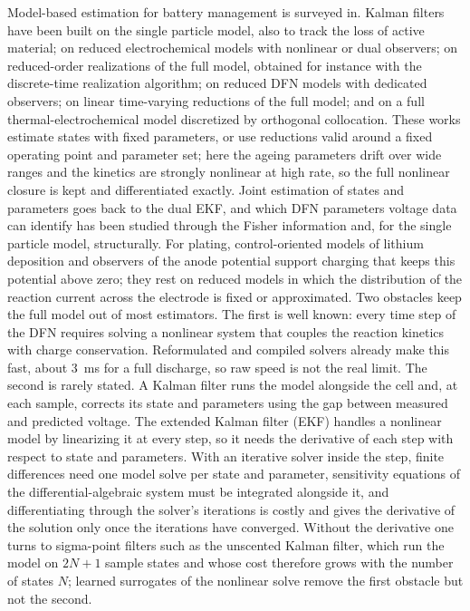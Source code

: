 \documentclass[journal]{IEEEtran}
\begin{document}
Model-based estimation for battery management is surveyed in\cite{chaturvedi2010}. Kalman filters have been built on the single particle model\cite{santhanagopalan2006}, also to track the loss of active material\cite{rahimian2012}; on reduced electrochemical models with nonlinear or dual observers\cite{corno2015,dey2015,bartlett2016}; on reduced-order realizations of the full model\cite{smith2010}, obtained for instance with the discrete-time realization algorithm\cite{lee2012,plett2015}; on reduced DFN models with dedicated observers\cite{klein2013}; on linear time-varying reductions of the full model\cite{sturm2018}; and on a full thermal-electrochemical model discretized by orthogonal collocation\cite{bizeray2015}. These works estimate states with fixed parameters, or use reductions valid around a fixed operating point and parameter set; here the ageing parameters drift over wide ranges and the kinetics are strongly nonlinear at high rate, so the full nonlinear closure is kept and differentiated exactly. Joint estimation of states and parameters goes back to the dual EKF\cite{plett2004}, and which DFN parameters voltage data can identify has been studied through the Fisher information\cite{schmidt2010,forman2012} and, for the single particle model, structurally\cite{bizeray2019}. For plating, control-oriented models of lithium deposition\cite{perkins2012} and observers of the anode potential\cite{li2021,chu2017} support charging that keeps this potential above zero\cite{chu2017,tomaszewska2019}; they rest on reduced models in which the distribution of the reaction current across the electrode is fixed or approximated. Two obstacles keep the full model out of most estimators. The first is well known: every time step of the DFN requires solving a nonlinear system that couples the reaction kinetics with charge conservation. Reformulated and compiled solvers already make this fast\cite{subramanian2009,torchio2016}, about \SI{3}{\milli\second} for a full discharge\cite{petlion}, so raw speed is not the real limit. The second is rarely stated. A Kalman filter runs the model alongside the cell and, at each sample, corrects its state and parameters using the gap between measured and predicted voltage. The extended Kalman filter (EKF) handles a nonlinear model by linearizing it at every step, so it needs the derivative of each step with respect to state and parameters. With an iterative solver inside the step, finite differences need one model solve per state and parameter, sensitivity equations of the differential-algebraic system\cite{cao2003} must be integrated alongside it, and differentiating through the solver's iterations is costly and gives the derivative of the solution only once the iterations have converged. Without the derivative one turns to sigma-point filters such as the unscented Kalman filter\cite{julier2004,wan2000}, which run the model on $2N+1$ sample states and whose cost therefore grows with the number of states $N$; learned surrogates of the nonlinear solve\cite{minn2024} remove the first obstacle but not the second.
\end{document}
